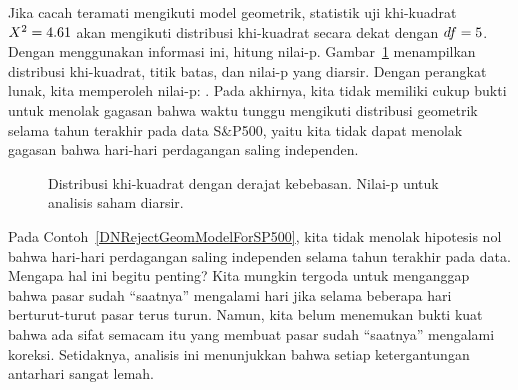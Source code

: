 \begin{examplewrap}
\begin{nexample}{Jika cacah teramati mengikuti
    model geometrik, statistik uji khi-kuadrat
    $X^2 = 4.61{}$ akan mengikuti distribusi khi-kuadrat secara dekat
    dengan $df = 5{}$.
    Dengan menggunakan informasi ini, hitung nilai-p.} 
  \label{DNRejectGeomModelForSP500}%
  Gambar~\ref{geomFitPValueForSP500} menampilkan
  distribusi khi-kuadrat, titik batas, dan nilai-p yang diarsir.
  Dengan perangkat lunak, kita memperoleh nilai-p: \spdaysPvalue{}.
  Pada akhirnya, kita tidak memiliki cukup bukti untuk menolak
  gagasan bahwa waktu tunggu mengikuti distribusi geometrik
  selama \spyears{} tahun terakhir pada data
  S\&P500,
  yaitu kita tidak dapat menolak gagasan bahwa hari-hari perdagangan
  saling independen.
\end{nexample}
\end{examplewrap}

\begin{figure}[h]
  \centering
  \caption{Distribusi khi-kuadrat dengan \spdaysDF{}
      derajat kebebasan.
      Nilai-p untuk analisis saham diarsir.}
  \label{geomFitPValueForSP500}
\end{figure}

\begin{examplewrap}
\begin{nexample}{Pada
    Contoh~\ref{DNRejectGeomModelForSP500},
    kita tidak menolak hipotesis nol bahwa hari-hari perdagangan
    saling independen selama \spyears{} tahun terakhir pada data.
    Mengapa hal ini begitu penting?}
  Kita mungkin tergoda untuk menganggap bahwa pasar sudah ``saatnya''
  mengalami hari  jika selama beberapa hari berturut-turut
  pasar terus turun.
  Namun, kita belum menemukan bukti kuat bahwa ada
  sifat semacam itu yang membuat pasar sudah ``saatnya'' mengalami
  koreksi.
  Setidaknya, analisis ini menunjukkan bahwa setiap ketergantungan
  antarhari sangat lemah.
\end{nexample}
\end{examplewrap}


